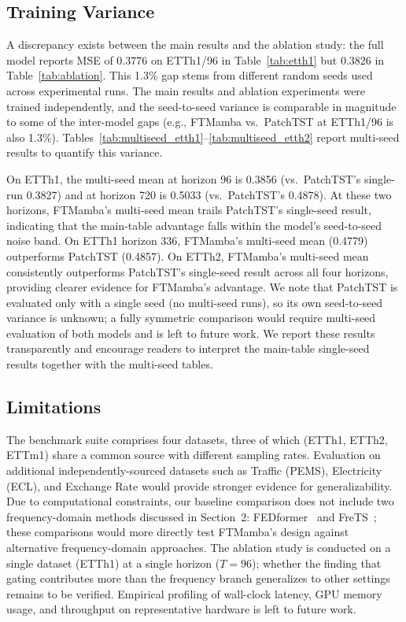 \documentclass[symmetry,article,submit,pdftex,moreauthors]{Definitions/mdpi}
\begin{document}
\subsection{Training Variance}

A discrepancy exists between the main results and the ablation study: the full model reports MSE of 0.3776 on ETTh1/96 in Table~\ref{tab:etth1} but 0.3826 in Table~\ref{tab:ablation}. This 1.3\% gap stems from different random seeds used across experimental runs. The main results and ablation experiments were trained independently, and the seed-to-seed variance is comparable in magnitude to some of the inter-model gaps (e.g., FTMamba vs.\ PatchTST at ETTh1/96 is also 1.3\%). Tables~\ref{tab:multiseed_etth1}--\ref{tab:multiseed_etth2} report multi-seed results to quantify this variance.

On ETTh1, the multi-seed mean at horizon 96 is 0.3856 (vs.\ PatchTST's single-run 0.3827) and at horizon 720 is 0.5033 (vs.\ PatchTST's 0.4878). At these two horizons, FTMamba's multi-seed mean trails PatchTST's single-seed result, indicating that the main-table advantage falls within the model's seed-to-seed noise band. On ETTh1 horizon 336, FTMamba's multi-seed mean (0.4779) outperforms PatchTST (0.4857). On ETTh2, FTMamba's multi-seed mean consistently outperforms PatchTST's single-seed result across all four horizons, providing clearer evidence for FTMamba's advantage. We note that PatchTST is evaluated only with a single seed (no multi-seed runs), so its own seed-to-seed variance is unknown; a fully symmetric comparison would require multi-seed evaluation of both models and is left to future work. We report these results transparently and encourage readers to interpret the main-table single-seed results together with the multi-seed tables.

\subsection{Limitations}\label{sec:limitations}

The benchmark suite comprises four datasets, three of which (ETTh1, ETTh2, ETTm1) share a common source with different sampling rates. Evaluation on additional independently-sourced datasets such as Traffic (PEMS), Electricity (ECL), and Exchange Rate would provide stronger evidence for generalizability. Due to computational constraints, our baseline comparison does not include two frequency-domain methods discussed in Section~2: FEDformer~\cite{ref7} and FreTS~\cite{ref16}; these comparisons would more directly test FTMamba's design against alternative frequency-domain approaches. The ablation study is conducted on a single dataset (ETTh1) at a single horizon ($T=96$); whether the finding that gating contributes more than the frequency branch generalizes to other settings remains to be verified. Empirical profiling of wall-clock latency, GPU memory usage, and throughput on representative hardware is left to future work.
\end{document}
